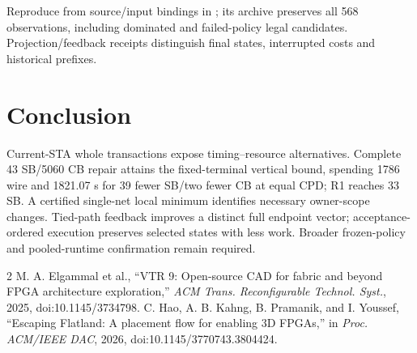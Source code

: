 \documentclass[conference,10pt]{IEEEtran}
\begin{document}
Reproduce from source/input bindings in ; its archive preserves all 568 observations, including dominated and failed-policy legal candidates. Projection/feedback receipts distinguish final states, interrupted costs and historical prefixes.

\section{Conclusion}
Current-STA whole transactions expose timing--resource alternatives. Complete 43 SB/5060 CB repair attains the fixed-terminal vertical bound, spending 1786 wire and 1821.07 s for 39 fewer SB/two fewer CB at equal CPD; R1 reaches 33 SB. A certified single-net local minimum identifies necessary owner-scope changes. Tied-path feedback improves a distinct full endpoint vector; acceptance-ordered execution preserves selected states with less work. Broader frozen-policy and pooled-runtime confirmation remain required.

\begin{thebibliography}{2}
 M. A. Elgammal et al., ``VTR 9: Open-source CAD for fabric and beyond FPGA architecture exploration,'' \emph{ACM Trans. Reconfigurable Technol. Syst.}, 2025, doi:10.1145/3734798.
 C. Hao, A. B. Kahng, B. Pramanik, and I. Youssef, ``Escaping Flatland: A placement flow for enabling 3D FPGAs,'' in \emph{Proc. ACM/IEEE DAC}, 2026, doi:10.1145/3770743.3804424.
\end{thebibliography}
\end{document}
